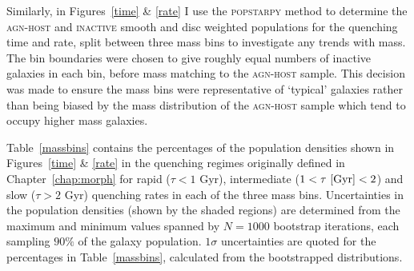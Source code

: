 Similarly, in Figures~\ref{time} \& \ref{rate} I use the \textsc{popstarpy} method to determine the \textsc{agn-host} and \textsc{inactive} smooth and disc weighted populations for the quenching time and rate, split between three mass bins to investigate any trends with mass. The bin boundaries were chosen to give roughly equal numbers of inactive galaxies in each bin, before mass matching to the \textsc{agn-host} sample. This decision was made to ensure the mass bins were representative of `typical' galaxies rather than being biased by the mass distribution of the \textsc{agn-host} sample which tend to occupy higher mass galaxies. 

Table~\ref{massbins} contains the percentages of the population densities shown in Figures~\ref{time} \& \ref{rate} in the quenching regimes originally defined in Chapter~\ref{chap:morph} for rapid ($\tau < 1$ Gyr), intermediate ($1 < \tau ~\rm{[Gyr]} < 2$) and slow ($\tau > 2$ Gyr) quenching rates in each of the three mass bins. Uncertainties in the population densities (shown by the shaded regions) are determined from the maximum and minimum values spanned by $N = 1000$ bootstrap iterations, each sampling $90\%$ of the galaxy population. $1\sigma$ uncertainties are quoted for the percentages in Table~\ref{massbins}, calculated from the bootstrapped distributions.


